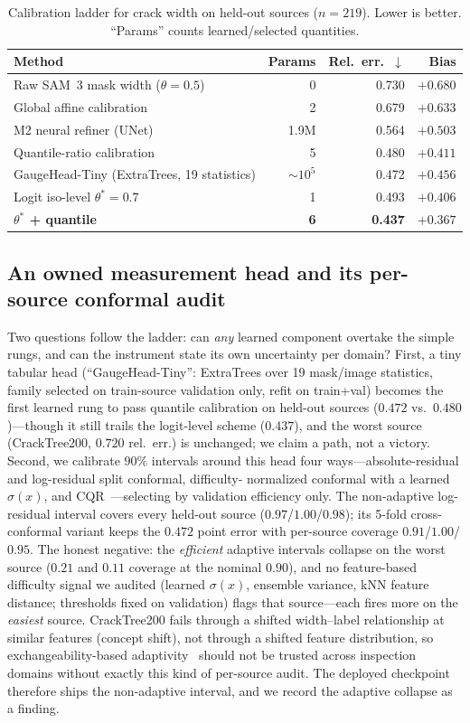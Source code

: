 \documentclass[11pt]{article}
\begin{document}
\begin{table}[t]
\centering\small
\caption{Calibration ladder for crack width on held-out sources ($n{=}219$). Lower is
better. ``Params'' counts learned/selected quantities.}
\label{tab:ladder}
\begin{tabular}{lrrr}
\toprule
Method & Params & Rel.\ err.\ $\downarrow$ & Bias \\
\midrule
Raw SAM~3 mask width ($\theta{=}0.5$) & 0 & 0.730 & $+0.680$ \\
Global affine calibration & 2 & 0.679 & $+0.633$ \\
M2 neural refiner (UNet) & 1.9M & 0.564 & $+0.503$ \\
Quantile-ratio calibration & 5 & 0.480 & $+0.411$ \\
GaugeHead-Tiny (ExtraTrees, 19 statistics) & $\sim$$10^5$ & 0.472 & $+0.456$ \\
Logit iso-level $\theta^\ast{=}0.7$ & 1 & 0.493 & $+0.406$ \\
\textbf{$\theta^\ast$ + quantile} & \textbf{6} & \textbf{0.437} & $+0.367$ \\
\bottomrule
\end{tabular}
\end{table}

\subsection{An owned measurement head and its per-source conformal audit}\label{sec:owned}
Two questions follow the ladder: can \emph{any} learned component overtake the simple
rungs, and can the instrument state its own uncertainty per domain? First, a tiny tabular
head (``GaugeHead-Tiny'': ExtraTrees over 19 mask/image statistics, family selected on
train-source validation only, refit on train+val) becomes the first learned rung to pass
quantile calibration on held-out sources ($0.472$ vs.\ $0.480$)---though it still trails
the logit-level scheme ($0.437$), and the worst source (CrackTree200, $0.720$ rel.\ err.)
is unchanged; we claim a path, not a victory. Second, we calibrate $90\%$ intervals around
this head four ways---absolute-residual and log-residual split conformal, difficulty-%
normalized conformal with a learned $\sigma(x)$, and CQR~\citep{romano2019cqr}---selecting
by validation efficiency only. The non-adaptive log-residual interval covers every
held-out source ($0.97$/$1.00$/$0.98$); its 5-fold cross-conformal variant keeps the
$0.472$ point error with per-source coverage $0.91$/$1.00$/$0.95$. The honest negative:
the \emph{efficient} adaptive intervals collapse on the worst source ($0.21$ and $0.11$
coverage at the nominal $0.90$), and no feature-based difficulty signal we audited
(learned $\sigma(x)$, ensemble variance, kNN feature distance; thresholds fixed on
validation) flags that source---each fires more on the \emph{easiest} source. CrackTree200
fails through a shifted width--label relationship at similar features (concept shift), not
through a shifted feature distribution, so exchangeability-based
adaptivity~\citep{lei2018distfree} should not be trusted across inspection domains without
exactly this kind of per-source audit. The deployed checkpoint therefore ships the
non-adaptive interval, and we record the adaptive collapse as a finding.
\end{document}
